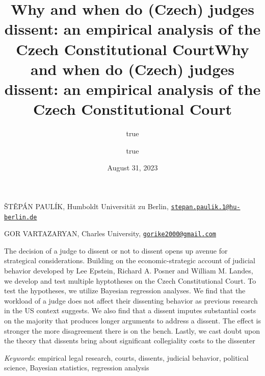 \documentclass[
  11pt,
]{article}
\title{Why and when do (Czech) judges dissent: an empirical analysis of
the Czech Constitutional Court}
\author{true \and true}
\date{August 31, 2023}
\title{Why and when do (Czech) judges dissent: an empirical analysis of
the Czech Constitutional Court }
\date{}
\renewenvironment{abstract}
 {{%
    \setlength{\leftmargin}{0mm}
    \setlength{\rightmargin}{\leftmargin}%
  }%
  \relax}
 {\endlist}
\begin{document}



{%
\setlength{\parindent}{0pt}
\thispagestyle{plain}
{%
\maketitle  %

}




{
   \vskip 13.5pt\relax \normalsize\fontsize{11}{12}
   \MakeUppercase{Štěpán Paulík}, \small{Humboldt Universität zu Berlin,
\href{mailto:stepan.paulik.1@hu-berlin.de}{\nolinkurl{stepan.paulik.1@hu-berlin.de}}}   \par \vskip -3.5pt \MakeUppercase{Gor
Vartazaryan}, \small{Charles University,
\href{mailto:gorike2000@gmail.com}{\nolinkurl{gorike2000@gmail.com}}}   

}

}








\begin{abstract}


    \vskip 8.5pt %

\noindent \small{The decision of a judge to dissent or not to dissent
opens up avenue for strategical considerations. Building on the
economic-strategic account of judicial behavior developed by Lee
Epstein, Richard A. Posner and William M. Landes, we develop and test
multiple hyptotheses on the Czech Constitutional Court. To test the
hypotheses, we utilize Bayesian regression analyses. We find that the
workload of a judge does not affect their dissenting behavior as
previous research in the US context suggests. We also find that a
dissent imputes substantial costs on the majority that produces longer
arguments to address a dissent. The effect is stronger the more
disagreement there is on the bench. Lastly, we cast doubt upon the
theory that dissents bring about significant collegiality costs to the
dissenter}


\vskip 8.5pt \noindent \emph{Keywords}: empirical legal research,
courts, dissents, judicial behavior, political science, Bayesian
statistics, regression analysis \par




\end{abstract}
\end{document}
